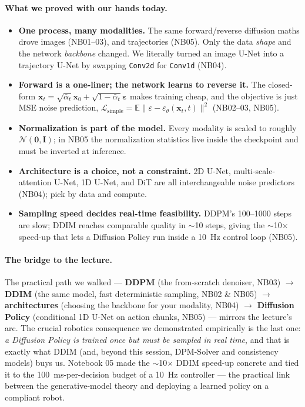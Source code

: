 \documentclass[11pt]{article}
\begin{document}
\paragraph{What we proved with our hands today.}
\begin{itemize}
  \item \textbf{One process, many modalities.} The same forward/reverse diffusion maths drove images
  (NB01--03), and trajectories (NB05). Only the data \emph{shape} and the network \emph{backbone}
  changed. We literally turned an image U-Net into a trajectory U-Net by swapping \texttt{Conv2d} for
  \texttt{Conv1d} (NB04).
  \item \textbf{Forward is a one-liner; the network learns to reverse it.} The closed-form
  $\mathbf{x}_t = \sqrt{\bar\alpha_t}\mathbf{x}_0 + \sqrt{1-\bar\alpha_t}\boldsymbol\varepsilon$ makes
  training cheap, and the objective is just MSE noise prediction,
  $\mathcal{L}_{\text{simple}} = \mathbb{E}\|\varepsilon - \varepsilon_\theta(\mathbf{x}_t,t)\|^2$
  (NB02--03, NB05).
  \item \textbf{Normalization is part of the model.} Every modality is scaled to roughly
  $\mathcal{N}(\mathbf{0},\mathbf{I})$; in NB05 the normalization statistics live inside the checkpoint
  and must be inverted at inference.
  \item \textbf{Architecture is a choice, not a constraint.} 2D U-Net, multi-scale-attention U-Net,
  1D U-Net, and DiT are all interchangeable noise predictors (NB04); pick by data and compute.
  \item \textbf{Sampling speed decides real-time feasibility.} DDPM's 100--1000 steps are slow; DDIM
  reaches comparable quality in $\sim$10 steps, giving the $\sim$10$\times$ speed-up that lets a
  Diffusion Policy run inside a 10~Hz control loop (NB05).
\end{itemize}

\paragraph{The bridge to the lecture.} The practical path we walked ---
\textbf{DDPM} (the from-scratch denoiser, NB03) $\rightarrow$ \textbf{DDIM} (the same model, fast
deterministic sampling, NB02 \& NB05) $\rightarrow$ \textbf{architectures} (choosing the backbone for
your modality, NB04) $\rightarrow$ \textbf{Diffusion Policy} (conditional 1D U-Net on action chunks,
NB05) --- mirrors the lecture's arc. The crucial robotics consequence we demonstrated empirically is the
last one: \emph{a Diffusion Policy is trained once but must be sampled in real time}, and that is exactly
what DDIM (and, beyond this session, DPM-Solver and consistency models) buys us. Notebook 05 made the
$\sim$10$\times$ DDIM speed-up concrete and tied it to the 100~ms-per-decision budget of a 10~Hz
controller --- the practical link between the generative-model theory and deploying a learned policy on a
compliant robot.
\end{document}
